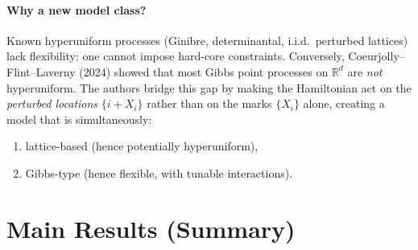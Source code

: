 \documentclass[11pt,a4paper]{article}
\begin{document}
\paragraph{Why a new model class?}
Known hyperuniform processes (Ginibre, determinantal, i.i.d.\ perturbed lattices) lack flexibility: one cannot impose hard-core constraints.
Conversely, Coeurjolly--Flint--Laverny (2024) showed that most Gibbs point processes on $\mathbb{R}^d$ are \emph{not} hyperuniform.
The authors bridge this gap by making the Hamiltonian act on the \emph{perturbed locations} $\{i+X_i\}$ rather than on the marks $\{X_i\}$ alone, creating a model that is simultaneously:
\begin{enumerate}[nosep]
  \item lattice-based (hence potentially hyperuniform),
  \item Gibbs-type (hence flexible, with tunable interactions).
\end{enumerate}

\section{Main Results (Summary)}
\end{document}
